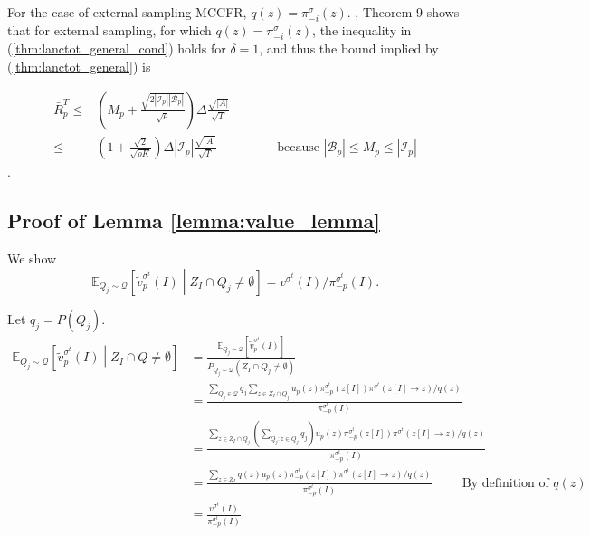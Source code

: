 \documentclass{article}
\begin{document}
For the case of external sampling MCCFR, $q(z)=\pi^\sigma_{-i}(z)$. \citealt{Lanctot09:Monte}, Theorem 9 shows that for external sampling, for which $q(z)=\pi^\sigma_{-i}(z)$, the inequality in (\ref{thm:lanctot_general_cond}) holds for $\delta=1$, and thus the bound implied by (\ref{thm:lanctot_general}) is

\begin{align}
    \bar{R}_p^T \leq &
    \left( M_p + \frac{\sqrt{2|\mathcal{I}_p||\mathcal{B}_p|}}{\sqrt{\rho}} \right)
    \Delta \frac{\sqrt{|A|}}{\sqrt{T}} \\
    \leq & \left(1 + \frac{\sqrt{2}}{\sqrt{\rho K}}\right)\Delta |\mathcal{I}_p| \frac{\sqrt{|A|}}{\sqrt{T}} \hspace{2cm} \textrm{because $|\mathcal{B}_p| \leq M_p \leq |\mathcal{I}_p|$}
\label{thm:lanctot_external1}
\end{align}
.

\subsection{Proof of Lemma \ref{lemma:value_lemma}}
\label{app:value_lemma}

We show $$\mathbb{E}_{Q_j\sim \mathcal{Q}} \left[ \tilde{v}_p^{\sigma^t}(I) \middle|  Z_I \cap Q_j \neq \emptyset \right] = v^{\sigma^t}(I) / \pi_{-p}^{\sigma^t}(I).$$

Let $q_j = P(Q_j)$.
\begin{align*}
    \mathbb{E}_{Q_j\sim \mathcal{Q}} \left[ \tilde{v}_p^{\sigma^t}(I) \middle| Z_I \cap Q \neq \emptyset \right] & = \frac{\mathbb{E}_{Q_j\sim \mathcal{Q}} \left[ \tilde{v}_p^{\sigma^t}(I) \right] }{ P_{Q_j \sim \mathcal{Q}}(Z_I \cap Q_j \neq \emptyset)} \\
    & = \frac{\sum_{Q_j\in \mathcal{Q}} q_j \sum_{z\in Z_I \cap Q_j} u_p(z) \pi_{-p}^{\sigma^t}(z[I]) \pi^{\sigma^t}(z[I] \to z) / q(z) }{ \pi_{-p}^{\sigma^t}(I)} \\
    & = \frac{  \sum_{z\in Z_I \cap Q_j} \left( \sum_{Q_j: z \in Q_j} q_j \right) u_p(z) \pi_{-p}^{\sigma^t}(z[I]) \pi^{\sigma^t}(z[I] \to z) / q(z) }{ \pi_{-p}^{\sigma^t}(I)} \\
    & = \frac{ \sum_{z\in Z_I} q(z) u_p(z) \pi_{-p}^{\sigma^t}(z[I]) \pi^{\sigma^t}(z[I] \to z) / q(z) }{ \pi_{-p}^{\sigma^t}(I)} \hspace{1cm} \textrm{By definition of $q(z)$} \\
    & = \frac{ v^{\sigma^t}(I) }{\pi_{-p}^{\sigma^t}(I)}
\end{align*}
\end{document}
